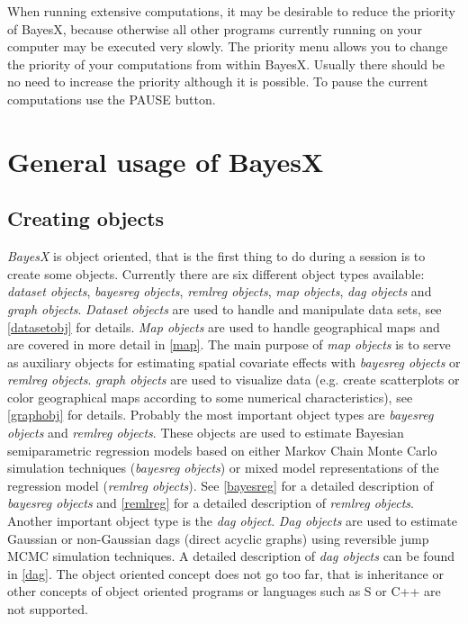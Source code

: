 When running extensive computations, it may be desirable to reduce
the priority of BayesX, because otherwise all other programs
currently running on your computer may be executed very slowly.
The priority menu allows you to change the priority of your
computations from within BayesX. Usually there should be no need
to increase the priority although it is possible. To pause the
current computations use the PAUSE button.

\section{General usage of BayesX}
\label{generalusage}

\subsection{Creating objects}
\label{createobject}

  {\em BayesX} is object
oriented, that is the first thing to do during a session is to
create some objects. Currently there are six different object types
available: {\em dataset objects}, {\em bayesreg objects}, {\em
remlreg objects}, {\em map objects}, {\em dag objects} and {\em
graph objects}. {\em Dataset objects} are used to handle and
manipulate data sets, see \autoref{datasetobj} for details. {\em Map
objects} are used to handle geographical maps and are covered in
more detail in \autoref{map}. The main purpose of {\em map objects}
is to serve as auxiliary objects for estimating spatial covariate
effects with {\em bayesreg objects} or {\em remlreg objects}. {\em
graph objects} are used to visualize data (e.g. create scatterplots
or color geographical maps according to some numerical
characteristics), see \autoref{graphobj} for details. Probably the
most important object types are {\em bayesreg objects} and {\em
remlreg objects}. These objects are used to estimate Bayesian
semiparametric regression models based on either Markov Chain Monte
Carlo simulation techniques ({\em bayesreg objects}) or mixed model
representations of the regression model ({\em remlreg objects}). See
\autoref{bayesreg} for a detailed description of {\em bayesreg
objects} and \autoref{remlreg} for a detailed description of {\em
remlreg objects}. Another important object type is the {\em dag
object}. {\em Dag objects} are used to estimate Gaussian or
non-Gaussian dags (direct acyclic graphs) using reversible jump MCMC
simulation techniques. A detailed description of {\em dag objects}
can be found in \autoref{dag}. The object oriented concept does not
go too far, that is inheritance or other concepts of object oriented
programs or languages such as S or C++ are not supported.

